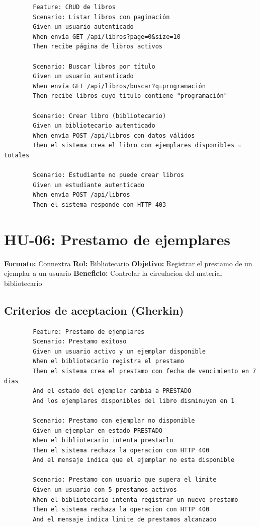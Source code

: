\documentclass[
11pt,
a4paper,
]{report}
\begin{document}
	\begin{lstlisting}
		Feature: CRUD de libros
		Scenario: Listar libros con paginación
		Given un usuario autenticado
		When envía GET /api/libros?page=0&size=10
		Then recibe página de libros activos
		
		Scenario: Buscar libros por título
		Given un usuario autenticado
		When envía GET /api/libros/buscar?q=programación
		Then recibe libros cuyo título contiene "programación"
		
		Scenario: Crear libro (bibliotecario)
		Given un bibliotecario autenticado
		When envía POST /api/libros con datos válidos
		Then el sistema crea el libro con ejemplares disponibles = totales
		
		Scenario: Estudiante no puede crear libros
		Given un estudiante autenticado
		When envía POST /api/libros
		Then el sistema responde con HTTP 403
	\end{lstlisting}
	
	\hypertarget{hu-06-prestamo-de-ejemplares}{%
		\section{HU-06: Prestamo de ejemplares}\label{hu-06-prestamo-de-ejemplares}}
	
	\textbf{Formato:} Connextra
	\textbf{Rol:} Bibliotecario
	\textbf{Objetivo:} Registrar el prestamo de un ejemplar a un usuario
	\textbf{Beneficio:} Controlar la circulacion del material bibliotecario
	
	\hypertarget{criterios-de-aceptacion-gherkin}{%
		\subsection{Criterios de aceptacion (Gherkin)}\label{criterios-de-aceptacion-gherkin}}
	
	\begin{lstlisting}
		Feature: Prestamo de ejemplares
		Scenario: Prestamo exitoso
		Given un usuario activo y un ejemplar disponible
		When el bibliotecario registra el prestamo
		Then el sistema crea el prestamo con fecha de vencimiento en 7 dias
		And el estado del ejemplar cambia a PRESTADO
		And los ejemplares disponibles del libro disminuyen en 1
		
		Scenario: Prestamo con ejemplar no disponible
		Given un ejemplar en estado PRESTADO
		When el bibliotecario intenta prestarlo
		Then el sistema rechaza la operacion con HTTP 400
		And el mensaje indica que el ejemplar no esta disponible
		
		Scenario: Prestamo con usuario que supera el limite
		Given un usuario con 5 prestamos activos
		When el bibliotecario intenta registrar un nuevo prestamo
		Then el sistema rechaza la operacion con HTTP 400
		And el mensaje indica limite de prestamos alcanzado
	\end{lstlisting}
	
\end{document}
